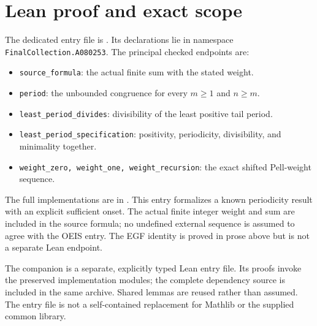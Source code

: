 \documentclass[11pt,a4paper]{article}
\theoremstyle{remark}
\begin{document}
\section{Lean proof and exact scope}
The dedicated entry file is . Its declarations lie in namespace \texttt{FinalCollection.A080253}. The principal checked endpoints are:
\begin{itemize}[nosep]
\item \texttt{source\_formula}: the actual finite sum with the stated weight.
\item \texttt{period}: the unbounded congruence for every $m\ge1$ and $n\ge m$.
\item \texttt{least\_period\_divides}: divisibility of the least positive tail period.
\item \texttt{least\_period\_specification}: positivity, periodicity, divisibility, and minimality together.
\item \texttt{weight\_zero, weight\_one, weight\_recursion}: the exact shifted Pell-weight sequence.
\end{itemize}
The full implementations are in .
This entry formalizes a known periodicity result with an explicit sufficient onset. The actual finite integer weight and sum are included in the source formula; no undefined external sequence is assumed to agree with the OEIS entry. The EGF identity is proved in prose above but is not a separate Lean endpoint. 

The companion is a separate, explicitly typed Lean entry file. Its proofs
invoke the preserved implementation modules; the complete dependency source
is included in the same archive. Shared lemmas are reused rather than
assumed. The entry file is not a self-contained replacement for Mathlib or
the supplied common library.
\end{document}
